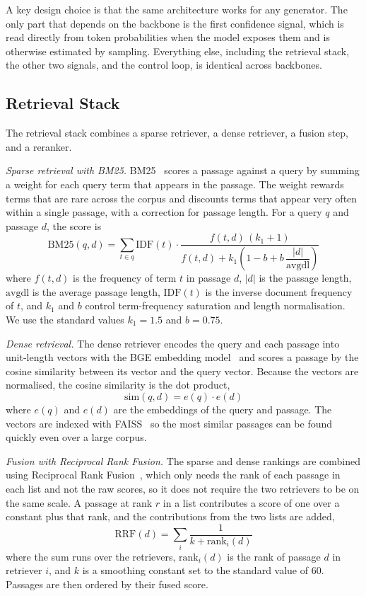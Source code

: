 \documentclass[conference,a4paper,10pt]{IEEEtran}
\begin{document}
A key design choice is that the same architecture works for any generator. The only part
that depends on the backbone is the first confidence signal, which is read directly from
token probabilities when the model exposes them and is otherwise estimated by sampling.
Everything else, including the retrieval stack, the other two signals, and the control
loop, is identical across backbones.

\subsection{Retrieval Stack}
The retrieval stack combines a sparse retriever, a dense retriever, a fusion step, and a
reranker.

\textit{Sparse retrieval with BM25.}
BM25~\cite{robertson2009bm25} scores a passage against a query by summing a weight for
each query term that appears in the passage. The weight rewards terms that are rare
across the corpus and discounts terms that appear very often within a single passage,
with a correction for passage length. For a query $q$ and passage $d$, the score is
\begin{equation}
\text{BM25}(q,d) = \sum_{t \in q} \text{IDF}(t) \cdot
\frac{f(t,d)\,(k_1 + 1)}{f(t,d) + k_1\!\left(1 - b + b\,\dfrac{|d|}{\text{avgdl}}\right)}
\end{equation}
where $f(t,d)$ is the frequency of term $t$ in passage $d$, $|d|$ is the passage length,
$\text{avgdl}$ is the average passage length, $\text{IDF}(t)$ is the inverse document
frequency of $t$, and $k_1$ and $b$ control term-frequency saturation and length
normalisation. We use the standard values $k_1 = 1.5$ and $b = 0.75$.

\textit{Dense retrieval.}
The dense retriever encodes the query and each passage into unit-length vectors with the
BGE embedding model~\cite{xiao2024cpack} and scores a passage by the cosine similarity
between its vector and the query vector. Because the vectors are normalised, the cosine
similarity is the dot product,
\begin{equation}
\text{sim}(q,d) = e(q) \cdot e(d)
\end{equation}
where $e(q)$ and $e(d)$ are the embeddings of the query and passage. The vectors are
indexed with FAISS~\cite{johnson2021faiss} so the most similar passages can be found
quickly even over a large corpus.

\textit{Fusion with Reciprocal Rank Fusion.}
The sparse and dense rankings are combined using Reciprocal Rank
Fusion~\cite{cormack2009rrf}, which only needs the rank of each passage in each list and
not the raw scores, so it does not require the two retrievers to be on the same scale. A
passage at rank $r$ in a list contributes a score of one over a constant plus that rank,
and the contributions from the two lists are added,
\begin{equation}
\text{RRF}(d) = \sum_{i} \frac{1}{k + \text{rank}_i(d)}
\end{equation}
where the sum runs over the retrievers, $\text{rank}_i(d)$ is the rank of passage $d$ in
retriever $i$, and $k$ is a smoothing constant set to the standard value of 60. Passages
are then ordered by their fused score.
\end{document}
